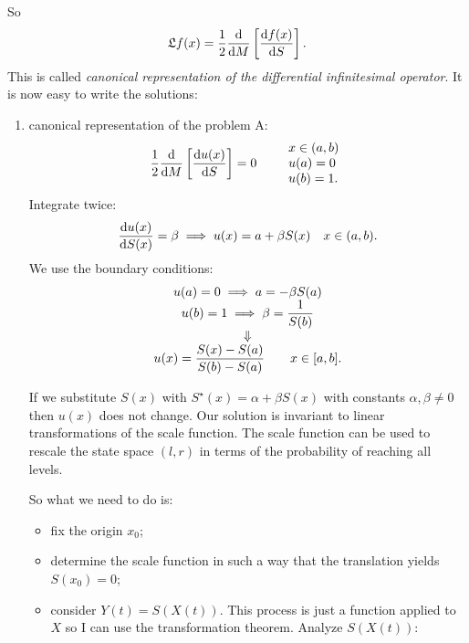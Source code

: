 \documentclass[12pt]{report}
\begin{document}
So
\begin{equation*}
	\mathfrak{L}f(x)=\frac{1}{2}\frac{\mathop{}\!\mathrm{d}}{\mathop{}\!\mathrm{d} M}\left[\frac{\mathop{}\!\mathrm{d} f(x)}{\mathop{}\!\mathrm{d} S}\right].
\end{equation*}
This is called \emph{canonical representation of the differential infinitesimal operator}. It is now easy to write the solutions:
\begin{enumerate}[\bfseries A:]
	\item canonical representation of the problem A:
	\begin{equation*}
		\frac{1}{2}\frac{\mathop{}\!\mathrm{d}}{\mathop{}\!\mathrm{d} M}\left[\frac{\mathop{}\!\mathrm{d} u(x)}{\mathop{}\!\mathrm{d} S}\right]=0\qquad\begin{array}{l}
			x\in(a,b)\\
			u(a)=0\\
			u(b)=1.
		\end{array}
	\end{equation*}
	Integrate twice:
	\begin{equation*}
		\frac{\mathop{}\!\mathrm{d} u(x)}{\mathop{}\!\mathrm{d} S(x)}=\beta\implies u(x)=a+\beta S(x)\quad x\in(a,b).
	\end{equation*}
	We use the boundary conditions:
	\begin{equation*}
		\begin{array}{>{\displaystyle}c}
			u(a)=0\implies a=-\beta S(a)\\
			u(b)=1\implies \beta=\frac{1}{S(b)}\\
			\Downarrow\\
			u(x)=\frac{S(x)-S(a)}{S(b)-S(a)}\qquad x\in[a,b].
		\end{array}
	\end{equation*}
	\begin{remark}
		If we substitute $S(x)$ with $S^{\star}(x)=\alpha+\beta S(x)$ with constants $\alpha,\beta\neq0$ then $u(x)$ does not change. Our solution is invariant to linear transformations of the scale function. The scale function can be used to rescale the state space $(l,r)$ in terms of the probability of reaching all levels.
	\end{remark}
	So what we need to do is:
	\begin{itemize}
		\item fix the origin $x_{0}$;
		\item determine the scale function in such a way that the translation yields $S(x_{0})=0$;
		\item consider $Y(t)=S(X(t))$. This process is just a function applied to $X$ so I can use the transformation theorem. Analyze $S(X(t))$:
		\begin{itemize}

\end{itemize}
\end{itemize}
\end{enumerate}
\end{document}
